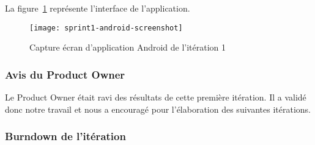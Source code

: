La figure~\ref{fig:sprint1-android-screenshot} représente l'interface de
l'application.
\begin{figure}[htbp]
  \centering
  \texttt{[image: sprint1-android-screenshot]}
  \caption{Capture écran d'application Android de l'itération 1}
  \label{fig:sprint1-android-screenshot}
\end{figure}

\subsubsection{Avis du Product Owner}

Le Product Owner était ravi des résultats de cette première itération. Il a
validé donc notre travail et nous a encouragé pour l'élaboration des suivantes
itérations.

\subsubsection{Burndown de l'itération}


